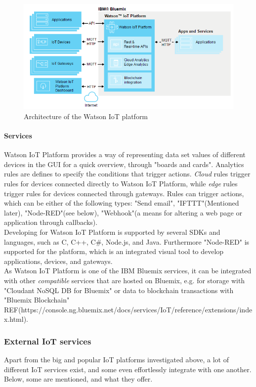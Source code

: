 \begin{figure}[h!]
	\centering
	\includegraphics[width=\textwidth]{figures/ibm/architecture.png}
	\caption{Architecture of the Watson IoT platform}
	\label{fig:ibm:architecture}
\end{figure}

\paragraph{Services}
Watson IoT Platform provides a way of representing data set values of different devices in the GUI for a quick overview, through "boards and cards". Analytics rules are defines to specify the conditions that trigger actions. \textit{Cloud} rules trigger rules for devices connected directly to Watson IoT Platform, while \textit{edge} rules trigger rules for devices connected through gateways. Rules can trigger actions, which can be either of the following types: "Send email", "IFTTT"(Mentioned later), "Node-RED"(see below), "Webhook"(a means for altering a web page or application through callbacks). \\

Developing for Watson IoT Platform is supported by several SDKs and languages, such as C, C++, C\#, Node.js, and Java. Furthermore "Node-RED" is supported for the platform, which is an integrated visual tool to develop applications, devices, and gateways. \\

As Watson IoT Platform is one of the IBM Bluemix services, it can be integrated with other \textit{compatible} services that are hosted on Bluemix, e.g. for storage with "Cloudant NoSQL DB for Bluemix" or data to blockchain transactions with "Bluemix Blockchain" REF(https://console.ng.bluemix.net/docs/services/IoT/reference/extensions/index.html).

\subsubsection{External IoT services}
Apart from the big and popular IoT platforms investigated above, a lot of different IoT services exist, and some even effortlessly integrate with one another. Below, some are mentioned, and what they offer.

